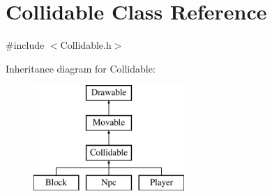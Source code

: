 \hypertarget{class_collidable}{\section{Collidable Class Reference}
\label{class_collidable}
}


{\ttfamily \#include $<$Collidable.\-h$>$}

Inheritance diagram for Collidable\-:\begin{figure}[H]
\begin{center}
\leavevmode
\includegraphics[height=4.000000cm]{class_collidable}
\end{center}
\end{figure}
